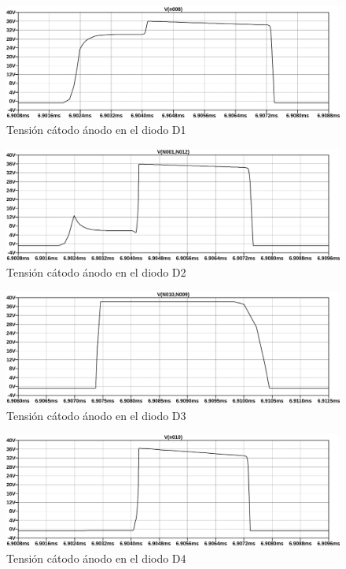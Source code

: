 \begin{figure}[ht]
    \centering
    \includegraphics[width=\textwidth]{images/sim/24.pdf}
    \caption{Tensión cátodo ánodo en el diodo D1}
    \label{fig:sim:24}
\end{figure}

\begin{figure}[ht]
    \centering
    \includegraphics[width=\textwidth]{images/sim/25.pdf}
    \caption{Tensión cátodo ánodo en el diodo D2}
    \label{fig:sim:25}
\end{figure}

\begin{figure}[ht]
    \centering
    \includegraphics[width=\textwidth]{images/sim/26.pdf}
    \caption{Tensión cátodo ánodo en el diodo D3}
    \label{fig:sim:26}
\end{figure}

\begin{figure}[ht]
    \centering
    \includegraphics[width=\textwidth]{images/sim/27.pdf}
    \caption{Tensión cátodo ánodo en el diodo D4}
    \label{fig:sim:27}
\end{figure}

